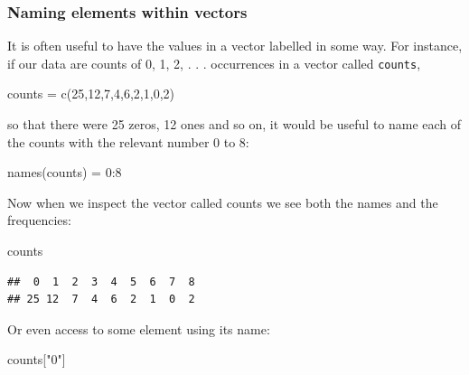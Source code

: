 \documentclass[
]{book}
\newenvironment{Shaded}{\begin{snugshade}}{\end{snugshade}}
\newcommand{\DecValTok}[1]{\textcolor[rgb]{0.00,0.00,0.81}{#1}}
\newcommand{\FunctionTok}[1]{\textcolor[rgb]{0.00,0.00,0.00}{#1}}
\newcommand{\NormalTok}[1]{#1}
\newcommand{\OtherTok}[1]{\textcolor[rgb]{0.56,0.35,0.01}{#1}}
\newcommand{\SpecialCharTok}[1]{\textcolor[rgb]{0.00,0.00,0.00}{#1}}
\newcommand{\StringTok}[1]{\textcolor[rgb]{0.31,0.60,0.02}{#1}}
\begin{document}
\hypertarget{naming-elements-within-vectors}{%
\subsubsection{Naming elements within vectors}\label{naming-elements-within-vectors}}

It is often useful to have the values in a vector labelled in some way. For instance, if our data are counts of 0, 1, 2, . . . occurrences in a vector called \texttt{counts},

\begin{Shaded}
\begin{Highlighting}[]
\NormalTok{counts }\OtherTok{=} \FunctionTok{c}\NormalTok{(}\DecValTok{25}\NormalTok{,}\DecValTok{12}\NormalTok{,}\DecValTok{7}\NormalTok{,}\DecValTok{4}\NormalTok{,}\DecValTok{6}\NormalTok{,}\DecValTok{2}\NormalTok{,}\DecValTok{1}\NormalTok{,}\DecValTok{0}\NormalTok{,}\DecValTok{2}\NormalTok{)}
\end{Highlighting}
\end{Shaded}

so that there were 25 zeros, 12 ones and so on, it would be useful to name each of the counts with the relevant number 0 to 8:

\begin{Shaded}
\begin{Highlighting}[]
\FunctionTok{names}\NormalTok{(counts) }\OtherTok{=} \DecValTok{0}\SpecialCharTok{:}\DecValTok{8}
\end{Highlighting}
\end{Shaded}

Now when we inspect the vector called counts we see both the names and the frequencies:

\begin{Shaded}
\begin{Highlighting}[]
\NormalTok{counts}
\end{Highlighting}
\end{Shaded}

\begin{verbatim}
##  0  1  2  3  4  5  6  7  8 
## 25 12  7  4  6  2  1  0  2
\end{verbatim}

Or even access to some element using its name:

\begin{Shaded}
\begin{Highlighting}[]
\NormalTok{counts[}\StringTok{"0"}\NormalTok{]}
\end{Highlighting}
\end{Shaded}
\end{document}
